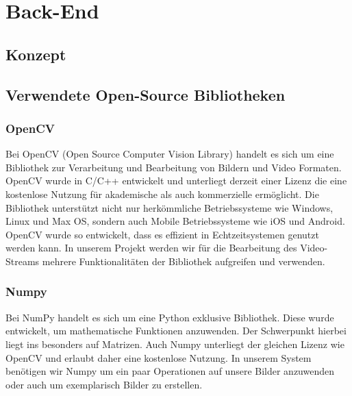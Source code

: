 \chapter{Back-End}
\section{Konzept}
\section{Verwendete Open-Source Bibliotheken}
\subsection{OpenCV}
Bei OpenCV (Open Source Computer Vision Library) handelt es sich um eine Bibliothek zur Verarbeitung und Bearbeitung von Bildern und Video Formaten.  OpenCV wurde in C/C++ entwickelt und unterliegt derzeit einer Lizenz die eine kostenlose Nutzung für akademische als auch kommerzielle ermöglicht. Die Bibliothek unterstützt nicht nur herkömmliche Betriebssysteme wie Windows, Linux und Max OS, sondern auch Mobile Betriebssysteme wie iOS und Android. OpenCV wurde so entwickelt, dass es effizient in Echtzeitsystemen genutzt werden kann. In unserem Projekt werden wir für die Bearbeitung des Video-Streams mehrere Funktionalitäten der Bibliothek aufgreifen und verwenden.
\subsection{Numpy}
Bei NumPy handelt es sich um eine Python exklusive Bibliothek. Diese wurde entwickelt, um mathematische Funktionen anzuwenden. Der Schwerpunkt hierbei liegt ins besonders auf Matrizen. Auch Numpy unterliegt der gleichen Lizenz wie OpenCV und erlaubt daher eine kostenlose Nutzung. In unserem System benötigen wir Numpy um ein paar Operationen auf unsere Bilder anzuwenden oder auch um exemplarisch Bilder zu erstellen.
